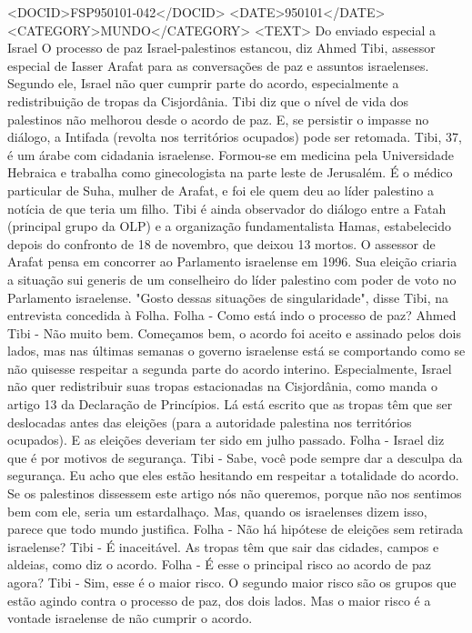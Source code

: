 <DOCID>FSP950101-042</DOCID>
<DATE>950101</DATE>
<CATEGORY>MUNDO</CATEGORY>
<TEXT>
Do enviado especial a Israel 
O processo de paz Israel-palestinos estancou, diz Ahmed Tibi, assessor especial de Iasser Arafat para as conversações de paz e assuntos israelenses. Segundo ele, Israel não quer cumprir parte do acordo, especialmente a redistribuição de tropas da Cisjordânia.
Tibi diz que o nível de vida dos palestinos não melhorou desde o acordo de paz. E, se persistir o impasse no diálogo, a Intifada (revolta nos territórios ocupados) pode ser retomada.
Tibi, 37, é um árabe com cidadania israelense. Formou-se em medicina pela Universidade Hebraica e trabalha como ginecologista na parte leste de Jerusalém. É o médico particular de Suha, mulher de Arafat, e foi ele quem deu ao líder palestino a notícia de que teria um filho.
Tibi é ainda observador do diálogo entre a Fatah (principal grupo da OLP) e a organização fundamentalista Hamas, estabelecido depois do confronto de 18 de novembro, que deixou 13 mortos.
O assessor de Arafat pensa em concorrer ao Parlamento israelense em 1996. Sua eleição criaria a situação sui generis de um conselheiro do líder palestino com poder de voto no Parlamento israelense. "Gosto dessas situações de singularidade", disse Tibi, na entrevista concedida à Folha.
Folha - Como está indo o processo de paz?
Ahmed Tibi - Não muito bem. Começamos bem, o acordo foi aceito e assinado pelos dois lados, mas nas últimas semanas o governo israelense está se comportando como se não quisesse respeitar a segunda parte do acordo interino.
Especialmente, Israel não quer redistribuir suas tropas estacionadas na Cisjordânia, como manda o artigo 13 da Declaração de Princípios. Lá está escrito que as tropas têm que ser deslocadas antes das eleições (para a autoridade palestina nos territórios ocupados). E as eleições deveriam ter sido em julho passado.
Folha - Israel diz que é por motivos de segurança.
Tibi - Sabe, você pode sempre dar a desculpa da segurança. Eu acho que eles estão hesitando em respeitar a totalidade do acordo. Se os palestinos dissessem  este artigo nós não queremos, porque não nos sentimos bem com ele, seria um estardalhaço. Mas, quando os israelenses dizem isso, parece que todo mundo justifica.
Folha - Não há hipótese de eleições sem retirada israelense?
Tibi - É inaceitável. As tropas têm que sair das cidades, campos e aldeias, como diz o acordo.
Folha - É esse o principal risco ao acordo de paz agora?
Tibi - Sim, esse é o maior risco. O segundo maior risco são os grupos que estão agindo contra o processo de paz, dos dois lados. Mas o maior risco é a vontade israelense de não cumprir o acordo.

